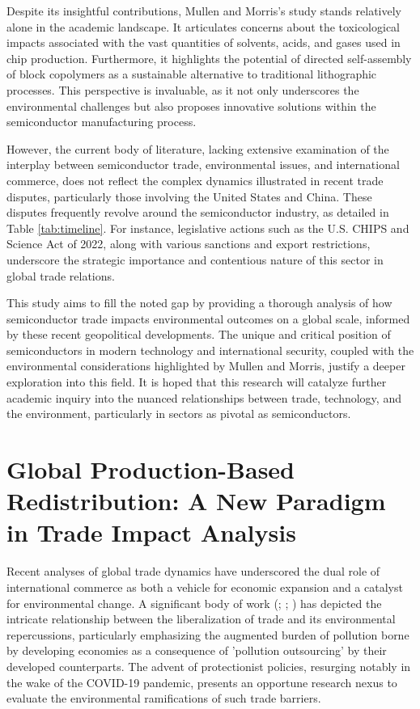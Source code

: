 Despite its insightful contributions, Mullen and Morris's study stands relatively alone in the academic landscape. It articulates concerns about the toxicological impacts associated with the vast quantities of solvents, acids, and gases used in chip production. Furthermore, it highlights the potential of directed self-assembly of block copolymers as a sustainable alternative to traditional lithographic processes. This perspective is invaluable, as it not only underscores the environmental challenges but also proposes innovative solutions within the semiconductor manufacturing process.

However, the current body of literature, lacking extensive examination of the interplay between semiconductor trade, environmental issues, and international commerce, does not reflect the complex dynamics illustrated in recent trade disputes, particularly those involving the United States and China. These disputes frequently revolve around the semiconductor industry, as detailed in Table \ref{tab:timeline}. For instance, legislative actions such as the U.S. CHIPS and Science Act of 2022, along with various sanctions and export restrictions, underscore the strategic importance and contentious nature of this sector in global trade relations.

This study aims to fill the noted gap by providing a thorough analysis of how semiconductor trade impacts environmental outcomes on a global scale, informed by these recent geopolitical developments. The unique and critical position of semiconductors in modern technology and international security, coupled with the environmental considerations highlighted by Mullen and Morris, justify a deeper exploration into this field. It is hoped that this research will catalyze further academic inquiry into the nuanced relationships between trade, technology, and the environment, particularly in sectors as pivotal as semiconductors.

\section{Global Production-Based Redistribution: A New Paradigm in Trade Impact Analysis}
Recent analyses of global trade dynamics have underscored the dual role of international commerce as both a vehicle for economic expansion and a catalyst for environmental change. A significant body of work (; ; ) has depicted the intricate relationship between the liberalization of trade and its environmental repercussions, particularly emphasizing the augmented burden of pollution borne by developing economies as a consequence of 'pollution outsourcing' by their developed counterparts. The advent of protectionist policies, resurging notably in the wake of the COVID-19 pandemic, presents an opportune research nexus to evaluate the environmental ramifications of such trade barriers.

